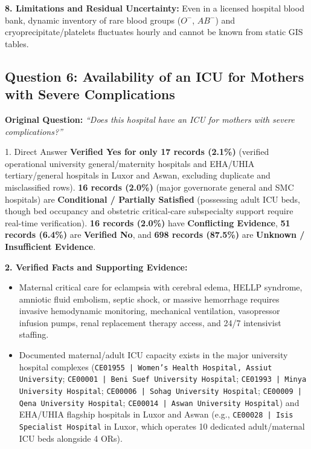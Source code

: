 \documentclass[10pt,a4paper]{article}
\begin{document}
\textbf{8. Limitations and Residual Uncertainty:}
Even in a licensed hospital blood bank, dynamic inventory of rare blood groups ($O^{-}$, $AB^{-}$) and cryoprecipitate/platelets fluctuates hourly and cannot be known from static GIS tables.

\subsection{Question 6: Availability of an ICU for Mothers with Severe Complications}
\textbf{Original Question:} \textit{``Does this hospital have an ICU for mothers with severe complications?''}

\begin{auditbox}{1. Direct Answer}
\textbf{Verified Yes for only 17 records (2.1\%)} (verified operational university general/maternity hospitals and EHA/UHIA tertiary/general hospitals in Luxor and Aswan, excluding duplicate and misclassified rows). \textbf{16 records (2.0\%)} (major governorate general and SMC hospitals) are \textbf{Conditional / Partially Satisfied} (possessing adult ICU beds, though bed occupancy and obstetric critical-care subspecialty support require real-time verification). \textbf{16 records (2.0\%)} have \textbf{Conflicting Evidence}, \textbf{51 records (6.4\%)} are \textbf{Verified No}, and \textbf{698 records (87.5\%)} are \textbf{Unknown / Insufficient Evidence}.
\end{auditbox}

\textbf{2. Verified Facts and Supporting Evidence:}
\begin{itemize}
    \item Maternal critical care for eclampsia with cerebral edema, HELLP syndrome, amniotic fluid embolism, septic shock, or massive hemorrhage requires invasive hemodynamic monitoring, mechanical ventilation, vasopressor infusion pumps, renal replacement therapy access, and 24/7 intensivist staffing.
    \item Documented maternal/adult ICU capacity exists in the major university hospital complexes (\texttt{CE01955 | Women's Health Hospital, Assiut University}; \texttt{CE00001 | Beni Suef University Hospital}; \texttt{CE01993 | Minya University Hospital}; \texttt{CE00006 | Sohag University Hospital}; \texttt{CE00009 | Qena University Hospital}; \texttt{CE00014 | Aswan University Hospital}) and EHA/UHIA flagship hospitals in Luxor and Aswan (e.g., \texttt{CE00028 | Isis Specialist Hospital} in Luxor, which operates 10 dedicated adult/maternal ICU beds alongside 4 ORs).
\end{itemize}
\end{document}
